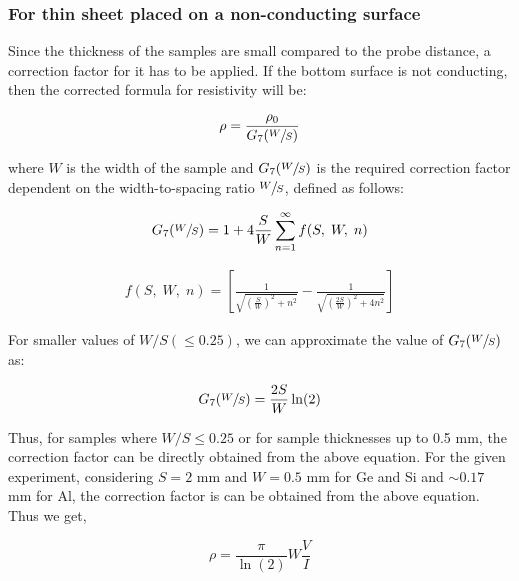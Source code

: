 \subsubsection*{For thin sheet placed on a non-conducting surface}
Since the thickness of the samples are small compared to the probe distance, a correction factor for it has to be applied. If the bottom surface is not conducting, then the corrected formula for resistivity will be:

\begin{align}\rho = \frac{\rho_0}{G_7(\sfrac{W}{S})}\end{align}

where $W$ is the width of the sample and $G_7(\sfrac{W}{S})$ is the required correction factor dependent
on the width-to-spacing ratio $\sfrac{W}{S}$, defined as follows:

\begin{align}
    G_7(\sfrac{W}{S}) = 1 + 4 \frac{S}{W}\sum_{n=1}^{\infty} f(S,\;W,\;n) 
\end{align}

\begin{align}
    f(S,\;W,\;n) = \left[\frac{1}{\sqrt{\left(\frac{S}{W}\right)^2+n^2}} - \frac{1}{\sqrt{\left(\frac{2S}{W}\right)^2+4n^2}}\right]
\end{align}

For smaller values of $W/S (\le 0.25)$, we can approximate the value of $G_7(\sfrac{W}{S})$ as:

\begin{align}
    G_7(\sfrac{W}{S}) = \frac{2S}{W}\ln(2)
\end{align}

Thus, for samples where $W/S \le 0.25$ or for sample thicknesses up to 0.5 mm, the correction factor can be directly obtained from the above equation.
For the given experiment, considering $S = 2$ mm
and $W = 0.5$ mm for Ge and Si and $\sim 0.17$ mm for Al, the correction factor is can be obtained from the above equation. Thus we get,

\begin{equation}\label{e2}
    \rho = \frac{\pi}{\ln(2)}W\frac{V}{I}
\end{equation}

